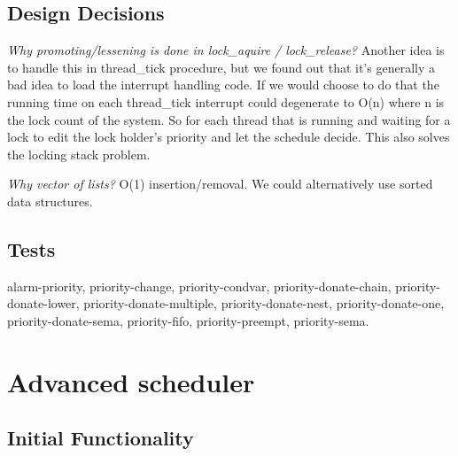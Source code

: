 

    \subsection{Design Decisions}

	\textit{Why promoting/lessening is done in \textit{lock\_aquire} / \textit{lock\_release}?}
	Another idea is to handle this in thread\_tick procedure, but we found out that it's generally a bad idea to load the interrupt handling code. If we would choose to do that the running time on each thread\_tick interrupt could degenerate to O(n) where n is the lock count of the system. So for each thread that is running and waiting for a lock to edit the lock holder's priority and let the schedule decide. This also solves the locking stack problem.

	\textit{Why vector of lists?}
	O(1) insertion/removal. We could alternatively use sorted data structures.

    \subsection{Tests}

	alarm-priority, priority-change, priority-condvar, priority-donate-chain, priority-donate-lower, priority-donate-multiple, priority-donate-nest, priority-donate-one, priority-donate-sema, priority-fifo, priority-preempt, priority-sema.
	

\section{Advanced scheduler}

    \subsection{Initial Functionality}

